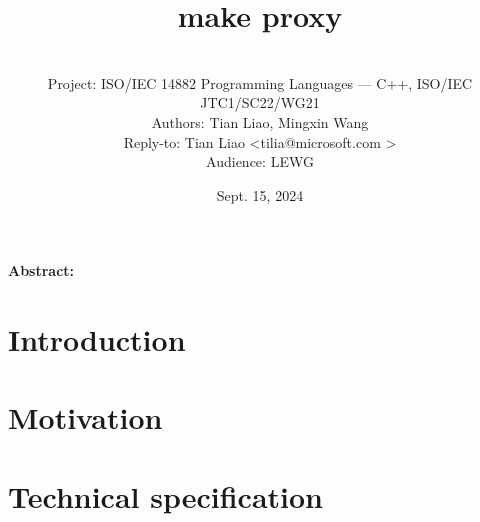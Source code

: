 \documentclass[10pt, a4paper, oneside]{article}
\title{make proxy}
\date{Sept. 15, 2024}
\author{%
\ \\
Project: ISO/IEC 14882 Programming Languages — C++, ISO/IEC JTC1/SC22/WG21\\
Authors: Tian Liao, Mingxin Wang\\
Reply-to: Tian Liao \textless tilia@microsoft.com \textgreater \\
Audience: LEWG\\
}
\makeatletter
\renewcommand{\maketitle}{\bgroup\setlength{\parindent}{0pt}
\begin{flushleft}
  \textbf{\huge \@title}

  \@author
\end{flushleft}\egroup
}
\makeatother
\begin{document}
\maketitle

\textbf{Abstract:} \lipsum[1]

\section{Introduction}
\lipsum[1]

\section{Motivation}
\lipsum[1]

\section{Technical specification}
\lipsum[1]
\end{document}

